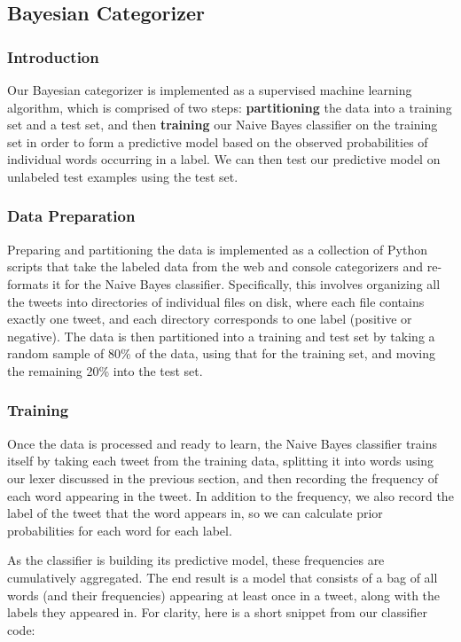 \documentclass[12pt,a4paper]{article}
\begin{document}
\subsection { Bayesian Categorizer }

\subsubsection { Introduction }

Our Bayesian categorizer is implemented as a supervised machine learning algorithm, which is comprised of two steps: \textbf{partitioning} the data into a training set and a test set, and then \textbf{training} our Naive Bayes classifier on the training set in order to form a predictive model based on the observed probabilities of individual words occurring in a label. We can then test our predictive model on unlabeled test examples using the test set.

\subsubsection { Data Preparation }

Preparing and partitioning the data is implemented as a collection of Python scripts that take the labeled data from the web and console categorizers and re-formats it for the Naive Bayes classifier. Specifically, this involves organizing all the tweets into directories of individual files on disk, where each file contains exactly one tweet, and each directory corresponds to one label (positive or negative). The data is then partitioned into a training and test set by taking a random sample of 80\% of the data, using that for the training set, and moving the remaining 20\% into the test set.

\subsubsection { Training }

Once the data is processed and ready to learn, the Naive Bayes classifier trains itself by taking each tweet from the training data, splitting it into words using our lexer discussed in the previous section, and then recording the frequency of each word appearing in the tweet. In addition to the frequency, we also record the label of the tweet that the word appears in, so we can calculate prior probabilities for each word for each label.

As the classifier is building its predictive model, these frequencies are cumulatively aggregated. The end result is a model that consists of a bag of all words (and their frequencies) appearing at least once in a tweet, along with the labels they appeared in. For clarity, here is a short snippet from our classifier code:
\end{document}
